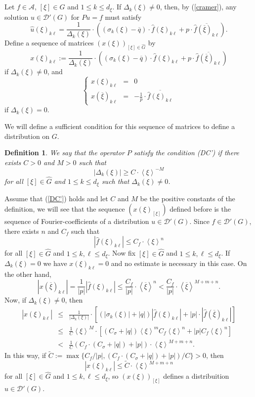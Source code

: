 \documentclass[sn-mathphys-num]{sn-jnl}%
\numberwithin{equation}{section}
\theoremstyle{thmstyleone}
\theoremstyle{thmstyletwo}
\theoremstyle{thmstylethree}
\newtheorem{definition}{Definition}[section]
\def\jp#1{{\left\langle{#1}\right\rangle}}
\begin{document}
Let $f \in \mathcal{A}$, $[\xi] \in \widehat{G}$ and $1 \leq k \leq d_\xi$. If $\Delta_k(\xi)\neq 0$, then, by (\ref{cramer}), any solution $u \in \mathcal{D}'(G)$ for $Pu=f$ must satisfy
$$\widehat{u}(\xi)_{k\ell} = \frac{1}{\Delta_k(\xi)}\cdot \left((\sigma_k(\xi)-\overline{q})\cdot \widehat{f}(\xi)_{k\ell}+p \cdot \overline{ \widehat{f}(\overline{\xi})_{k\ell}} \right).$$
Define a sequence of matrices $(x(\xi))_{[\xi] \in \widehat{G}}$ by
$$x(\xi)_{k\ell} :=\frac{1}{\Delta_k(\xi)}\cdot \left((\sigma_k(\xi)-\overline{q})\cdot \widehat{f}(\xi)_{k\ell}+p \cdot \overline{ \widehat{f}(\overline{\xi})_{k\ell}} \right)$$
if $\Delta_k(\xi) \neq 0$, and
$$\left \{ \begin{array}{ccc} x(\xi)_{k\ell} & = & 0 \\ x(\overline{\xi})_{k\ell} & = & -\frac{1}{\overline{p}} \cdot \overline{\widehat{f}(\xi)_{k\ell}} \end{array}\right.$$ 
if $\Delta_k(\xi)=0$. 

We will define a sufficient condition for this sequence of matrices to define a distribution on $G$.

\begin{definition} We say that the operator $P$ satisfy the condition (DC') if there exists $C>0$ and $M>0$ such that
	\begin{equation}\label{DC'} |\Delta_k(\xi)| \geq C\cdot \jp{\xi}^{-M}		
	\end{equation}
for all $[\xi] \in \widehat{G}$ and $1 \leq k \leq d_\xi$ such that $\Delta_k(\xi) \neq 0$. 	
\end{definition} 

Assume that (\ref{DC'}) holds and let $C$ and $M$ be the positive constants of the definition, we will see that the sequence $(x(\xi)_{[\xi]})$ defined before is the sequence of Fourier-coefficients of a distribution $u \in \mathcal{D}'(G)$. Since $f \in \mathcal{D}'(G)$, there exists $n$ and $C_f$ such that
$$|\widehat{f}(\xi)_{k\ell}| \leq C_f \cdot \jp{\xi}^n$$
for all $[\xi]\in \widehat{G}$ and $1 \leq k,\ell \leq d_\xi$. Now fix $[\xi] \in \widehat{G}$ and $1 \leq k,\ell \leq d_\xi$. If $\Delta_k(\xi)=0$ we have $x(\xi)_{k\ell}=0$ and no estimate is necessary in this case. On the other hand,
$$|x(\overline{\xi})_{k\ell}| = \frac{1}{|p|} |\widehat{f}(\xi)_{k\ell}| \leq \frac{C_f}{|p|}\cdot \jp{\overline{\xi}}^n<\frac{C_f}{|p|}\cdot \jp{\overline{\xi}}^{M+m+n}.$$
Now, if $\Delta_k(\xi) \neq 0$, then
\begin{eqnarray*} |x(\xi)_{k\ell}|& \leq & \frac{1}{|\Delta_k(\xi)|}\cdot \left[(|\sigma_k(\xi)|+|q|)|\widehat{f}(\xi)_{k\ell}|+|p|\cdot |\widehat{f}(\overline{\xi})_{k\ell}| \right] \\
	& \leq & \frac{1}{C} \jp{\xi}^M \cdot \left[ (C_\sigma+|q|)\jp{\xi}^m C_f \jp{\xi}^n+|p| C_f \jp{\xi}^n \right] \\
	& < & \frac{1}{C} \left( C_f\cdot (C_\sigma+|q|)+|p|\right) \cdot \jp{\xi}^{M+m+n}.
\end{eqnarray*} 
In this way, if $\widetilde{C}:= \max \{C_f/|p|, \left( C_f\cdot (C_\sigma+|q|)+|p|\right)/C\}>0$, then
$$|x(\xi)_{k\ell}| \leq \widetilde{C} \cdot \jp{\xi}^{M+m+n}$$
for all $[\xi]\in \widehat{G}$ and $1 \leq k,\ell \leq d_\xi$, so $(x(\xi))_{[\xi]}$ defines a distribuition $u \in \mathcal{D}'(G)$. 
\end{document}
